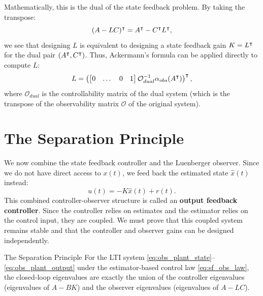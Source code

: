 Mathematically, this is the dual of the state feedback problem. By taking the transpose:
\begin{equation}
(A - L C)^\intercal = A^\intercal - C^\intercal L^\intercal ,
\end{equation}
we see that designing $L$ is equivalent to designing a state feedback gain $K = L^\intercal$ for the dual pair $(A^\intercal, C^\intercal)$. Thus, Ackermann's formula can be applied directly to compute $L$:
\begin{equation}
L = \left( \begin{bmatrix} 0 & \dots & 0 & 1 \end{bmatrix} \mathcal{O}_{dual}^{-1} \alpha_{obs}(A^\intercal) \right)^\intercal ,
\end{equation}
where $\mathcal{O}_{dual}$ is the controllability matrix of the dual system (which is the transpose of the observability matrix $\mathcal{O}$ of the original system).

\section{The Separation Principle}
We now combine the state feedback controller and the Luenberger observer. Since we do not have direct access to $x(t)$, we feed back the estimated state $\hat{x}(t)$ instead:
\begin{equation}
    u(t) = -K \hat{x}(t) + r(t) . \label{eq:sf_obs_law}
\end{equation}
This combined controller-observer structure is called an \textbf{output feedback controller}. Since the controller relies on estimates and the estimator relies on the control input, they are coupled. We must prove that this coupled system remains stable and that the controller and observer gains can be designed independently.

\begin{mytheorem}{The Separation Principle}
For the LTI system \eqref{eq:obs_plant_state}--\eqref{eq:obs_plant_output} under the estimator-based control law \eqref{eq:sf_obs_law}, the closed-loop eigenvalues are exactly the union of the controller eigenvalues (eigenvalues of $A - B K$) and the observer eigenvalues (eigenvalues of $A - L C$).
\end{mytheorem}

